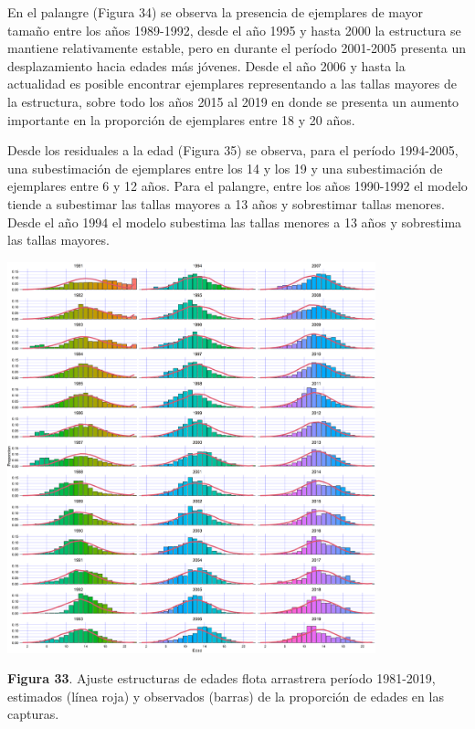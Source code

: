 \documentclass[
  spanish,
]{article}
\begin{document}
En el palangre (Figura 34) se observa la presencia de ejemplares de
mayor tamaño entre los años 1989-1992, desde el año 1995 y hasta 2000 la
estructura se mantiene relativamente estable, pero en durante el período
2001-2005 presenta un desplazamiento hacia edades más jóvenes. Desde el
año 2006 y hasta la actualidad es posible encontrar ejemplares
representando a las tallas mayores de la estructura, sobre todo los años
2015 al 2019 en donde se presenta un aumento importante en la proporción
de ejemplares entre 18 y 20 años.

Desde los residuales a la edad (Figura 35) se observa, para el período
1994-2005, una subestimación de ejemplares entre los 14 y los 19 y una
subestimación de ejemplares entre 6 y 12 años. Para el palangre, entre
los años 1990-1992 el modelo tiende a subestimar las tallas mayores a 13
años y sobrestimar tallas menores. Desde el año 1994 el modelo subestima
las tallas menores a 13 años y sobrestima las tallas mayores.

\begin{center}
\includegraphics[width=0.8\textwidth]{Figuras/FitAgeArrastre.png}
\end{center}

\small \textbf{Figura 33}. Ajuste estructuras de edades flota arrastrera
período 1981-2019, estimados (línea roja) y observados (barras) de la
proporción de edades en las capturas. \vspace{0.5cm} \normalsize
\end{document}
